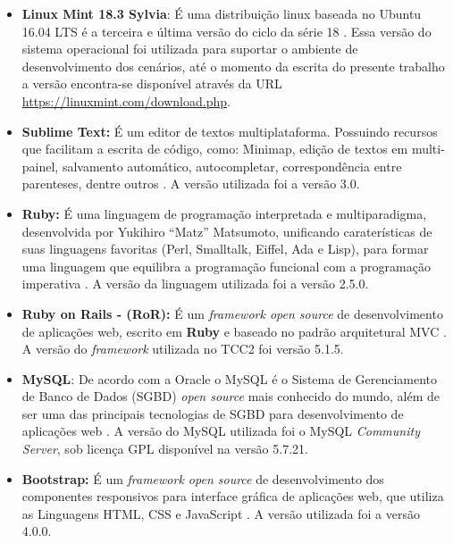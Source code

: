 \begin{itemize}
	
	\item \textbf{Linux Mint 18.3 Sylvia}: É uma distribuição linux baseada no Ubuntu 16.04 LTS é a terceira e última versão do ciclo da série 18 \cite{Mint}. Essa versão do sistema operacional foi utilizada para suportar o ambiente de desenvolvimento dos cenários,  até o momento da escrita do presente trabalho a versão encontra-se disponível através da URL \url{https://linuxmint.com/download.php}.
	
	\item \textbf{Sublime Text:} É um editor de textos multiplataforma. Possuindo recursos que facilitam a escrita de código, como: Minimap, edição de textos em multi-painel, salvamento automático, autocompletar, correspondência entre parenteses, dentre outros \cite{SublimeText}. A versão utilizada foi a versão 3.0.
	
	\item \textbf{Ruby:} É uma linguagem de programação interpretada e multiparadigma, desenvolvida por Yukihiro “Matz” Matsumoto, unificando caraterísticas de suas linguagens favoritas (Perl, Smalltalk, Eiffel, Ada e Lisp), para formar uma linguagem que equilibra a programação funcional com a programação imperativa \cite{Ruby}. A versão da linguagem utilizada foi a versão 2.5.0.
	
	\item \textbf{Ruby on Rails - (RoR):} É um  \textit{framework open source} de desenvolvimento de aplicações web, escrito em \textbf{Ruby} e baseado no padrão arquitetural MVC \cite{RoR}. A versão do \textit{framework} utilizada no TCC2 foi versão 5.1.5.
	
	\item \textbf{MySQL}: De acordo com a Oracle o MySQL é o Sistema de Gerenciamento de Banco de Dados (SGBD) \textit{open source} mais conhecido do mundo, além de ser uma das principais tecnologias de SGBD para desenvolvimento de aplicações web \cite{MySQL}. A versão do MySQL utilizada foi o MySQL \textit{Community Server}, sob licença GPL disponível na versão 5.7.21.
	
	\item \textbf{Bootstrap:} É um \textit{framework open source} de desenvolvimento dos componentes responsivos para interface gráfica de aplicações web, que utiliza as Linguagens HTML, CSS e JavaScript \cite{Bootstrap}. A versão utilizada foi a versão 4.0.0. 
	
\end{itemize}

